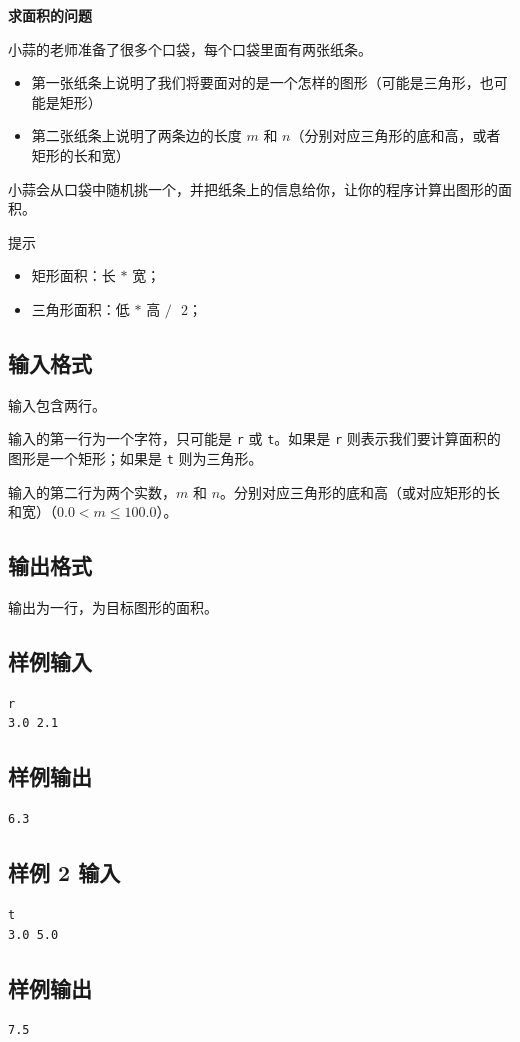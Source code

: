 \documentclass{article}
\newcommand{\problemname}[1]{\begin{center}\Large\bfseries #1\end{center}}
\begin{document}
\problemname{求面积的问题}

小蒜的老师准备了很多个口袋，每个口袋里面有两张纸条。

\begin{itemize}
  \item 第一张纸条上说明了我们将要面对的是一个怎样的图形（可能是三角形，也可能是矩形）

  \item 第二张纸条上说明了两条边的长度 $m$ 和 $n$（分别对应三角形的底和高，或者矩形的长和宽）

\end{itemize}
小蒜会从口袋中随机挑一个，并把纸条上的信息给你，让你的程序计算出图形的面积。

提示

\begin{itemize}
  \item 矩形面积：长 $*$ 宽；

  \item 三角形面积：低 $*$ 高 $/\text{ }2$；

\end{itemize}
\subsection*{输入格式}
输入包含两行。

输入的第一行为一个字符，只可能是 \texttt{r} 或 \texttt{t}。如果是 \texttt{r} 则表示我们要计算面积的图形是一个矩形；如果是 \texttt{t} 则为三角形。

输入的第二行为两个实数，$m$ 和 $n$。分别对应三角形的底和高（或对应矩形的长和宽）（$0.0<m\le100.0$）。

\subsection*{输出格式}
输出为一行，为目标图形的面积。

\subsection*{样例输入}
\begin{verbatim}
r
3.0 2.1
\end{verbatim}

\subsection*{样例输出}
\begin{verbatim}
6.3
\end{verbatim}

\subsection*{样例 2 输入}
\begin{verbatim}
t
3.0 5.0
\end{verbatim}

\subsection*{样例输出}
\begin{verbatim}
7.5
\end{verbatim}
\end{document}
